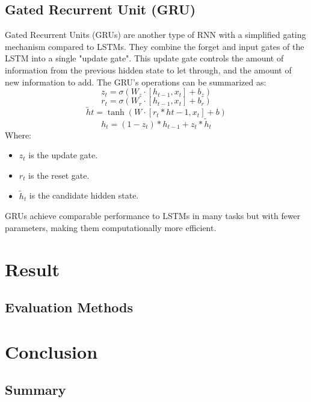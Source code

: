 \documentclass{ieeeojies}
\begin{document}
\subsection{Gated Recurrent Unit (GRU)}
Gated Recurrent Units (GRUs) are another type of RNN with a simplified gating mechanism compared to LSTMs. They combine the forget and input gates of the LSTM into a single "update gate". This update gate controls the amount of information from the previous hidden state to let through, and the amount of new information to add.
The GRU's operations can be summarized as:
\begin{dmath*}
    z_t = \sigma(W_z \cdot [h_{t-1}, x_t] + b_z)
\end{dmath*}
\begin{dmath*}
    r_t = \sigma(W_r \cdot [h_{t-1}, x_t] + b_r)
\end{dmath*}
\begin{dmath*}
    \tilde{h}t = \tanh(W \cdot [r_t * h{t-1}, x_t] + b)
\end{dmath*}
\begin{dmath*}
    h_t = (1 - z_t) * h_{t-1} + z_t * \tilde{h}_t
\end{dmath*}
Where:
\begin{itemize}
    \item \(z_t\) is the update gate.
    \item \(r_t\) is the reset gate.
    \item \(\tilde{h}_t\) is the candidate hidden state.
\end{itemize}
GRUs achieve comparable performance to LSTMs in many tasks but with fewer parameters, making them computationally more efficient.


\section{Result}

\subsection{Evaluation Methods}

\section{Conclusion}

\subsection{Summary}
\end{document}
